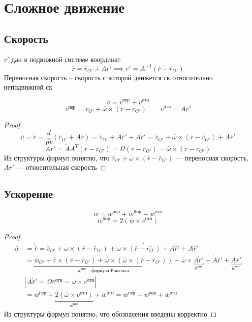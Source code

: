\documentclass[crop=false]{standalone}
\begin{document}
\section{Сложное движение}
\subsection{Скорость}
$r'$ дан в подвижной системе координат
\[\bar r = \bar r_{O'} + A r' \implies r' = A^{-1} (\bar r - \bar r_{O'})\]
\Def Переносная скорость – скорость с которой движется ск относительно неподвижной ск

\begin{theorem}[Кориолиса]
    \[\bar v = \bar v^{\text{пер}} + \bar v^{\text{отн}}\]
\[v^{\text{пер}} = \bar v_{O'} + \bar \omega \times (\bar r - \bar r_{O'}) \qquad \bar v^{\text{отн}} = A \dot {\bar r}'\]

\end{theorem}
\begin{proof}
    \[\bar v = \dot{\bar r} = \frac{d}{dt}{\left(\bar r_{O'} + A \bar r \right)} = \bar v_{O'} + \dot A \bar r' + A \dot {\bar r}'  = \bar v_{O'} + \bar \omega \times (\bar r - \bar r_{O'}) + A \dot {\bar r}'\]
\[\dot A r' = \dot A A^T (\bar r - \bar r_{O'}) = \Omega (\bar r - \bar r_{O'}) = \bar \omega \times (\bar r - \bar r_{O'}) \]
Из структуры формул понятно, что $\bar v_{O'} + \bar \omega \times (\bar r - \bar r_{O'})$ — переносная скорость, $A \dot {\bar r}'$ — относительная скорость
\end{proof}
\subsection{Ускорение}
\begin{theorem}[Кориолиса]
    \[\bar w = \bar w^{\text{пер}} + \bar w^{\text{Кор}} + \bar w^{\text{отн}} \]
    \[\bar w^{\text{Кор}} = 2 (\bar w \times \bar v^{\text{отн}})\]
\end{theorem}
\begin{proof}
    \[
\begin{aligned}
\bar w &= \dot {\bar v} = \dot{\bar v}_{O'} + \dot {\bar \omega} \times (\bar r - \bar r_{O'}) + \bar \omega \times \dot{\left(\bar r - \bar {r_{O'}}\right)} + \dot A \dot {\bar r}' + A \ddot{\bar r}' \\ 
&= \underbracket{\bar w_{O'} + \bar \varepsilon \times (\bar r - \bar r_{O'}) + \bar \omega \times(\bar \omega \times (\bar r - \bar r_{O'}))}_{\bar w^{\text{пер}} \quad \text{формула Ривальса}} + \bar \omega \times \underbracket{A \dot{\bar r}'}_{\bar v^{\text{отн}}} + \dot A \dot{\bar r}' + \underbracket{A \ddot{\bar r}'}_{\bar w^{\text{отн}}} \\
&\left| \dot A \dot{\bar r}' = \Omega \bar v^{\text{отн}} = \bar \omega \times v^{\text{отн}}\right| \\
&= \bar w^{\text{пер}} + \underbracket{2(\bar \omega \times v^{\text{отн}})}_{\bar w^{\text{Кор}}} + \bar w^{\text{отн}} = \bar w^{\text{пер}} + \bar w^{\text{кор}} + \bar w^{\text{отн}} 
 \end{aligned}
 \]
 Из структуры формул понятно, что обозначения введены корректно
\end{proof}
\end{document}
